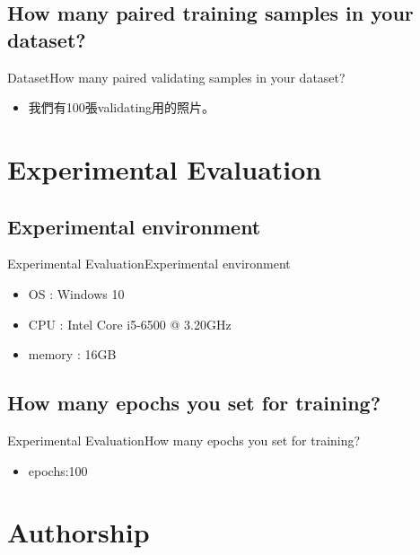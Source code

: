 \documentclass{beamer}
\begin{document}
\begin{CJK*}{UTF8}{bsmi}
\subsection*{How many paired training samples in your dataset?}
\begin{frame}{Dataset}{How many paired validating samples in your dataset?}
  \begin{itemize}
  \item {
   我們有100張validating用的照片。
  }
  \end{itemize}
\end{frame}

\section{Experimental Evaluation}
\subsection*{Experimental environment}
\begin{frame}{Experimental Evaluation}{Experimental environment}
  \begin{itemize}
  \item {
   OS : Windows 10
  }
  \item {
   CPU : Intel Core i5-6500 @ 3.20GHz
  }
  \item {
   memory : 16GB
  }
  \end{itemize}
\end{frame}
\subsection*{How many epochs you set for training?}
\begin{frame}{Experimental Evaluation}{How many epochs you set for training?}
  \begin{itemize}
  \item {
  epochs:100
  }
  \end{itemize}
\end{frame}

\section{Authorship}

\end{CJK*}
\end{document}
